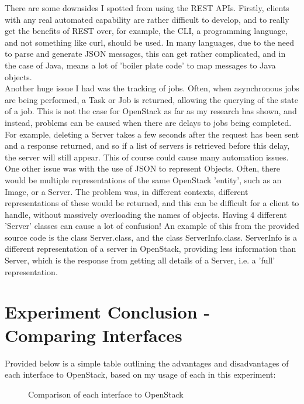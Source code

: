 There are some downsides I spotted from using the REST APIs. Firstly, clients with any real automated capability are rather difficult to develop, and to really get the benefits of REST over, for example, the CLI, a programming language, and not something like curl, should be used. In many languages, due to the need to parse and generate JSON messages, this can get rather complicated, and in the case of Java, means a lot of 'boiler plate code' to map messages to Java objects. \\
Another huge issue I had was the tracking of jobs. Often, when asynchronous jobs are being performed, a Task or Job is returned, allowing the querying of the state of a job. This is not the case for OpenStack as far as my research has shown, and instead, problems can be caused when there are delays to jobs being completed. For example, deleting a Server takes a few seconds after the request has been sent and a response returned, and so if a list of servers is retrieved before this delay, the server will still appear. This of course could cause many automation issues. 
One other issue was with the use of JSON to represent Objects. Often, there would be multiple representations of the same OpenStack 'entity', such as an Image, or a Server. The problem was, in different contexts, different representations of these would be returned, and this can be difficult for a client to handle, without massively overloading the names of objects. Having 4 different 'Server' classes can cause a lot of confusion! An example of this from the provided source code is the class Server.class, and the class ServerInfo.class. ServerInfo is a different representation of a server in OpenStack, providing less information than Server, which is the response from getting all details of a Server, i.e. a 'full' representation.   
 
  
\section{Experiment Conclusion - Comparing Interfaces}

Provided below is a simple table outlining the advantages and disadvantages of each interface to OpenStack, based on my usage of each in this experiment:  

\begin{figure}[H]
\centering
{}
\caption{Comparison of each interface to OpenStack} 
\end{figure}